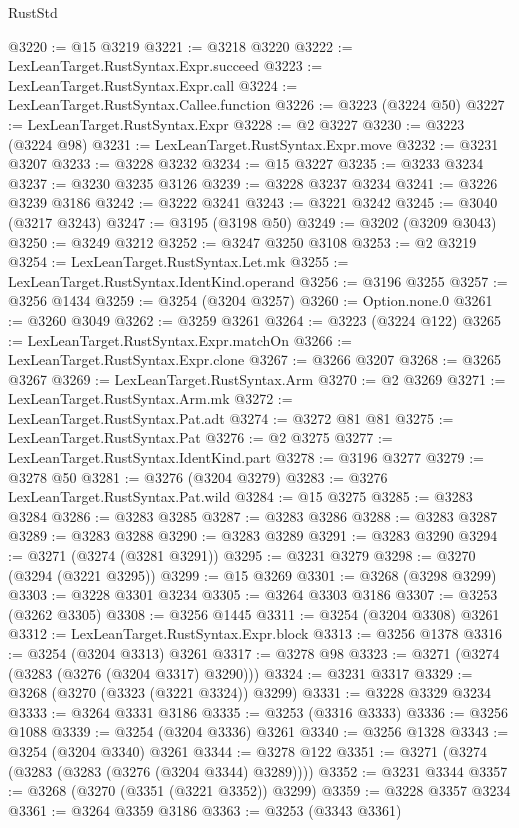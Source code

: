 \begin{lexlean}{RustStd}
\begin{coremodule}
{\begin{coremodule}
{{{{{{{{{{{{{{{{{{{{{{{{{{{{{{{{{{{{{@3220 := @15 @3219
@3221 := @3218 @3220
@3222 := LexLeanTarget.RustSyntax.Expr.succeed
@3223 := LexLeanTarget.RustSyntax.Expr.call
@3224 := LexLeanTarget.RustSyntax.Callee.function
@3226 := @3223 (@3224 @50)
@3227 := LexLeanTarget.RustSyntax.Expr
@3228 := @2 @3227
@3230 := @3223 (@3224 @98)
@3231 := LexLeanTarget.RustSyntax.Expr.move
@3232 := @3231 @3207
@3233 := @3228 @3232
@3234 := @15 @3227
@3235 := @3233 @3234
@3237 := @3230 @3235 @3126
@3239 := @3228 @3237 @3234
@3241 := @3226 @3239 @3186
@3242 := @3222 @3241
@3243 := @3221 @3242
@3245 := @3040 (@3217 @3243)
@3247 := @3195 (@3198 @50)
@3249 := @3202 (@3209 @3043)
@3250 := @3249 @3212
@3252 := @3247 @3250 @3108
@3253 := @2 @3219
@3254 := LexLeanTarget.RustSyntax.Let.mk
@3255 := LexLeanTarget.RustSyntax.IdentKind.operand
@3256 := @3196 @3255
@3257 := @3256 @1434
@3259 := @3254 (@3204 @3257)
@3260 := Option.none.{0}
@3261 := @3260 @3049
@3262 := @3259 @3261
@3264 := @3223 (@3224 @122)
@3265 := LexLeanTarget.RustSyntax.Expr.matchOn
@3266 := LexLeanTarget.RustSyntax.Expr.clone
@3267 := @3266 @3207
@3268 := @3265 @3267
@3269 := LexLeanTarget.RustSyntax.Arm
@3270 := @2 @3269
@3271 := LexLeanTarget.RustSyntax.Arm.mk
@3272 := LexLeanTarget.RustSyntax.Pat.adt
@3274 := @3272 @81 @81
@3275 := LexLeanTarget.RustSyntax.Pat
@3276 := @2 @3275
@3277 := LexLeanTarget.RustSyntax.IdentKind.part
@3278 := @3196 @3277
@3279 := @3278 @50
@3281 := @3276 (@3204 @3279)
@3283 := @3276 LexLeanTarget.RustSyntax.Pat.wild
@3284 := @15 @3275
@3285 := @3283 @3284
@3286 := @3283 @3285
@3287 := @3283 @3286
@3288 := @3283 @3287
@3289 := @3283 @3288
@3290 := @3283 @3289
@3291 := @3283 @3290
@3294 := @3271 (@3274 (@3281 @3291))
@3295 := @3231 @3279
@3298 := @3270 (@3294 (@3221 @3295))
@3299 := @15 @3269
@3301 := @3268 (@3298 @3299)
@3303 := @3228 @3301 @3234
@3305 := @3264 @3303 @3186
@3307 := @3253 (@3262 @3305)
@3308 := @3256 @1445
@3311 := @3254 (@3204 @3308) @3261
@3312 := LexLeanTarget.RustSyntax.Expr.block
@3313 := @3256 @1378
@3316 := @3254 (@3204 @3313) @3261
@3317 := @3278 @98
@3323 := @3271 (@3274 (@3283 (@3276 (@3204 @3317) @3290)))
@3324 := @3231 @3317
@3329 := @3268 (@3270 (@3323 (@3221 @3324)) @3299)
@3331 := @3228 @3329 @3234
@3333 := @3264 @3331 @3186
@3335 := @3253 (@3316 @3333)
@3336 := @3256 @1088
@3339 := @3254 (@3204 @3336) @3261
@3340 := @3256 @1328
@3343 := @3254 (@3204 @3340) @3261
@3344 := @3278 @122
@3351 := @3271 (@3274 (@3283 (@3283 (@3276 (@3204 @3344) @3289))))
@3352 := @3231 @3344
@3357 := @3268 (@3270 (@3351 (@3221 @3352)) @3299)
@3359 := @3228 @3357 @3234
@3361 := @3264 @3359 @3186
@3363 := @3253 (@3343 @3361)
}}}}}}}}}}}}}}}}}}}}}}}}}}}}}}}}}}}}}
\end{coremodule}}
\end{coremodule}
\end{lexlean}

